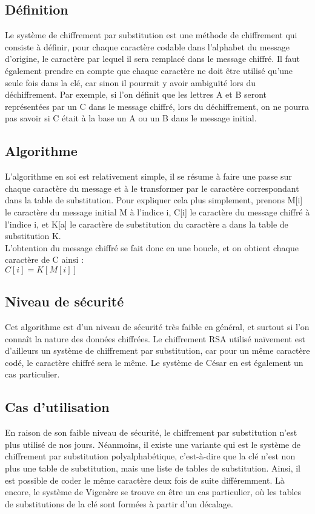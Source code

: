 		\subsection{Définition}
			Le système de chiffrement par substitution est une méthode de chiffrement qui consiste à définir, pour chaque caractère codable dans l'alphabet du message d'origine, le caractère par lequel il sera remplacé dans le message chiffré. Il faut également prendre en compte que chaque caractère ne doit être utilisé qu'une seule fois dans la clé, car sinon il pourrait y avoir ambiguïté lors du déchiffrement. Par exemple, si l'on définit que les lettres A et B seront représentées par un C dans le message chiffré, lors du déchiffrement, on ne pourra pas savoir si C était à la base un A ou un B dans le message initial.
		\subsection{Algorithme}
			L'algorithme en soi est relativement simple, il se résume à faire une passe sur chaque caractère du message et à le transformer par le caractère correspondant dans la table de substitution. Pour expliquer cela plus simplement, prenons M[i] le caractère du message initial M à l'indice i, C[i] le caractère du message chiffré à l'indice i, et K[a] le caractère de substitution du caractère a dans la table de substitution K.\\
			L'obtention du message chiffré se fait donc en une boucle, et on obtient chaque caractère de C ainsi :\\
			$C[i] = K[M[i]]$
		\subsection{Niveau de sécurité}
			Cet algorithme est d'un niveau de sécurité très faible en général, et surtout si l'on connaît la nature des données chiffrées. Le chiffrement RSA utilisé naïvement est d'ailleurs un système de chiffrement par substitution, car pour un même caractère codé, le caractère chiffré sera le même. Le système de César en est également un cas particulier.
		\subsection{Cas d'utilisation}
			En raison de son faible niveau de sécurité, le chiffrement par substitution n'est plus utilisé de nos jours. Néanmoins, il existe une variante qui est le système de chiffrement par substitution polyalphabétique, c'est-à-dire que la clé n'est non plus une table de substitution, mais une liste de tables de substitution. Ainsi, il est possible de coder le même caractère deux fois de suite différemment. Là encore, le système de Vigenère se trouve en être un cas particulier, où les tables de substitutions de la clé sont formées à partir d'un décalage.